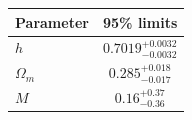 \begin{tabular} { l  c}

 Parameter &  95\% limits\\
\hline
{\boldmath$h              $} & $0.7019^{+0.0032}_{-0.0032}$\\

{\boldmath$Ω_m            $} & $0.285^{+0.018}_{-0.017}   $\\

{\boldmath$M              $} & $0.16^{+0.37}_{-0.36}      $\\
\hline
\end{tabular}
